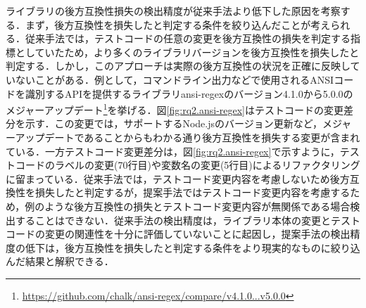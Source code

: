 \documentclass[11pt,dvipdfmx]{jreport}
\begin{document}
ライブラリの後方互換性損失の検出精度が従来手法より低下した原因を考察する．まず，後方互換性を損失したと判定する条件を絞り込んだことが考えられる．従来手法では，テストコードの任意の変更を後方互換性の損失を判定する指標としていたため，より多くのライブラリバージョンを後方互換性を損失したと判定する．しかし，このアプローチは実際の後方互換性の状況を正確に反映していないことがある．例として，コマンドライン出力などで使用されるANSIコードを識別するAPIを提供するライブラリansi-regexのバージョン4.1.0から5.0.0のメジャーアップデート\footnote{\url{https://github.com/chalk/ansi-regex/compare/v4.1.0...v5.0.0}}を挙げる．図\ref{fig:rq2.ansi-regex}はテストコードの変更差分を示す．この変更では，サポートするNode.jsのバージョン更新など，メジャーアップデートであることからもわかる通り後方互換性を損失する変更が含まれている．一方テストコード変更差分は，図\ref{fig:rq2.ansi-regex}で示すように，テストコードのラベルの変更(70行目)や変数名の変更(5行目)によるリファクタリングに留まっている．従来手法では，テストコード変更内容を考慮しないため後方互換性を損失したと判定するが，提案手法ではテストコード変更内容を考慮するため，例のような後方互換性の損失とテストコード変更内容が無関係である場合検出することはできない．従来手法の検出精度は，ライブラリ本体の変更とテストコードの変更の関連性を十分に評価していないことに起因し，提案手法の検出精度の低下は，後方互換性を損失したと判定する条件をより現実的なものに絞り込んだ結果と解釈できる．


\end{document}
